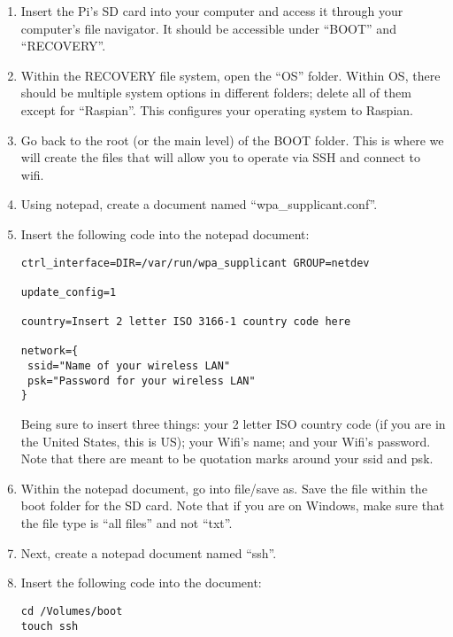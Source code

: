 \documentclass{article}\usepackage[]{graphicx}\usepackage[]{color}
\begin{document}
\begin{enumerate}

\item Insert the Pi's SD card into your computer and access it through your computer's file navigator.  It should be accessible under ``BOOT'' and ``RECOVERY''.

\item Within the RECOVERY file system, open the ``OS'' folder.  Within OS, there should be multiple system options in different folders; delete all of them except for ``Raspian''. This configures your operating system to Raspian.

\item Go back to the root (or the main level) of the BOOT folder.  This is where we will create the files that will allow you to operate via SSH and connect to wifi.

\item Using notepad, create a document named ``wpa\_supplicant.conf''. 

\item Insert the following code into the notepad document:

\begin{lstlisting}
ctrl_interface=DIR=/var/run/wpa_supplicant GROUP=netdev

update_config=1

country=Insert 2 letter ISO 3166-1 country code here

network={
 ssid="Name of your wireless LAN"
 psk="Password for your wireless LAN"
}
\end{lstlisting}

Being sure to insert three things: your 2 letter ISO country code (if you are in the United States, this is US); your Wifi's name; and your Wifi's password.  Note that there are meant to be quotation marks around your ssid and psk.

\item Within the notepad document, go into file/save as.  Save the file within the boot folder for the SD card.  Note that if you are on Windows, make sure that the file type is ``all files'' and not ``txt''.

\item Next, create a notepad document named ``ssh''.

\item Insert the following code into the document:

\begin{lstlisting}
cd /Volumes/boot
touch ssh
\end{lstlisting}


\end{enumerate}
\end{document}
